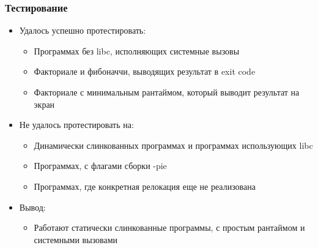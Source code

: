 \documentclass{beamer}
\begin{document}


\begin{frame}[t]
  \frametitle{Тестирование}
  \begin{itemize}
    \item Удалось успешно протестировать:
          \begin{itemize}
            \item Программах без libc, исполняющих системные вызовы
            \item Факториале и фибоначчи, выводящих результат в exit code
            \item Факториале с минимальным рантаймом, который выводит результат на экран
          \end{itemize}
    \item Не удалось протестировать на:
          \begin{itemize}
            \item Динамически слинкованных программах и программах использующих libc
            \item Программах, с флагами сборки -pie
            \item Программах, где конкретная релокация еще не реализована
          \end{itemize}
    \item Вывод:
          \begin{itemize}
            \item Работают статически слинкованные программы, с простым рантаймом и системными вызовами
          \end{itemize}
  \end{itemize}
\end{frame}
\end{document}
